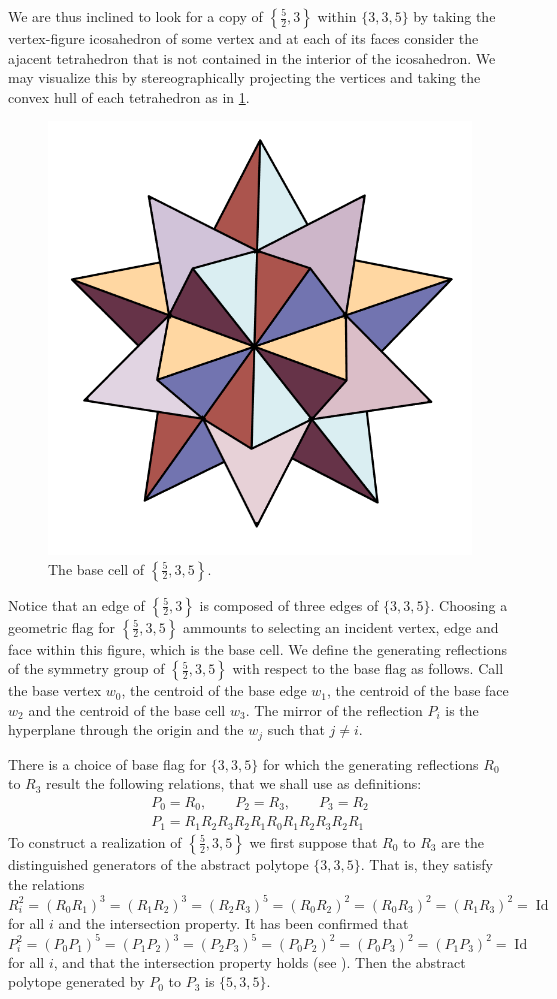\documentclass{article}
\theoremstyle{definition}
\DeclareMathOperator{\Id}{Id}
\begin{document}
	We are thus inclined to look for a copy of $\left\{\frac{5}{2},3\right\}$ within $\{3,3,5\}$ by taking the vertex-figure icosahedron of some vertex and at each of its faces consider the ajacent tetrahedron that is not contained in the interior of the icosahedron. We may visualize this by stereographically projecting the vertices and taking the convex hull of each tetrahedron as in \cref{fig:fig1}.
	
	\begin{figure}[h]
	\centering
	\includegraphics[width=0.7\linewidth]{fig1}
	\caption{The base cell of $\left\{\frac{5}{2},3,5\right\}$.}
	\label{fig:fig1}
	\end{figure}
	
	Notice that an edge of $\left\{\frac{5}{2},3\right\}$ is composed of three edges of $\{3,3,5\}$. Choosing a geometric flag for $\left\{\frac{5}{2},3,5\right\}$ ammounts to selecting an incident vertex, edge and face within this figure, which is the base cell.  We define the generating reflections of the symmetry group of $\left\{\frac{5}{2},3,5\right\}$ with respect to the base flag as follows. Call the base vertex $w_0$, the centroid of the base edge  $w_1$, the centroid of the base face  $w_2$ and the centroid of the base cell  $w_3$. The mirror of the reflection $P_i$ is the hyperplane through the origin and the $w_j$ such that $j\neq i$.
	
	There is a choice of base flag for $\{3,3,5\}$ for which the generating reflections $R_0$ to $R_3$ result the following relations, that we shall use as definitions:
	\begin{gather*}
		P_0=R_0,\qquad P_2=R_3,\qquad P_3=R_2\\
		P_1=R_1R_2R_3R_2R_1R_0R_1R_2R_3R_2R_1
	\end{gather*}
	To construct a realization of $\left\{\frac{5}{2},3,5\right\}$ we first suppose that $R_0$ to $R_3$ are the distinguished generators of the abstract polytope $\{3,3,5\}$. That is, they satisfy the relations
	\[R_i^2=(R_0R_1)^3=(R_1R_2)^3=(R_2R_3)^5=(R_0R_2)^2=(R_0R_3)^2=(R_1R_3)^2=\Id\]
	for all $i$ and the intersection property. It has been confirmed that
		\[P_i^2=(P_0P_1)^5=(P_1P_2)^3=(P_2P_3)^5=(P_0P_2)^2=(P_0P_3)^2=(P_1P_3)^2=\Id\]
	for all $i$, and that the intersection property holds (see ). Then the abstract polytope generated by $P_0$ to $P_3$ is $\{5,3,5\}$.
	
\end{document}
